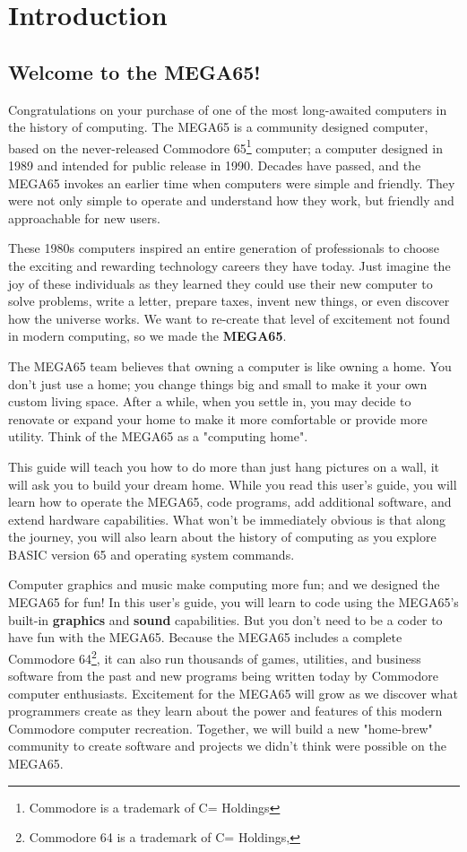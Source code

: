 \chapter{Introduction}

\section{Welcome to the MEGA65!}

Congratulations on your purchase of one of the most long-awaited computers in the history of computing. The MEGA65 is a community designed computer, based on the never-released Commodore{\textregistered} 65\footnote{Commodore is a trademark of C= Holdings} computer; a computer designed in 1989 and intended for public release in 1990. Decades have passed, and the MEGA65 invokes an earlier time when computers were simple and friendly. They were not only simple to operate and understand how they work, but friendly and approachable for new users.

These 1980s computers inspired an entire generation of professionals to choose the exciting and rewarding technology careers they have today. Just imagine the joy of these individuals as they learned they could use their new computer to solve problems, write a letter, prepare taxes, invent new things, or even discover how the universe works. We want to re-create that level of excitement not found in modern computing, so we made the {\bf MEGA65}.

The MEGA65 team believes that owning a computer is like owning a home. You don't just use a home; you change things big and small to make it your own custom living space. After a while, when you settle in, you may decide to renovate or expand your home to make it more comfortable or provide more utility. Think of the MEGA65 as a "computing home".

This guide will teach you how to do more than just hang pictures on a wall, it will ask you to build your dream home. While you read this user's guide, you will learn how to operate the MEGA65, code programs, add additional software, and extend hardware capabilities. What won't be immediately obvious is that along the journey, you will also learn about the history of computing as you explore BASIC version 65 and operating system commands.

Computer graphics and music make computing more fun; and we designed the MEGA65 for fun! In this user's guide, you will learn to code using the MEGA65's built-in {\bf graphics} and {\bf sound} capabilities. But you don't need to be a coder to have fun with the MEGA65. Because the MEGA65 includes a complete Commodore{\textregistered} 64{\texttrademark}\footnote{Commodore 64 is a trademark of C= Holdings,}, it can also run thousands of games, utilities, and business software from the past and new programs being written today by Commodore computer enthusiasts. Excitement for the MEGA65 will grow as we discover what programmers create as they learn about the power and features of this modern Commodore computer recreation. Together, we will build a new "home-brew" community to create software and projects we didn't think were possible on the MEGA65.

